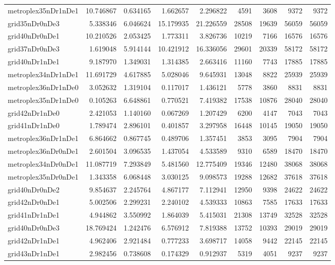 \begin{longtable}{|l|r|r|r|r|r|r|r|r|}
metroplex35nDr1nDe1 & 10.746867 & 0.634165 & 1.662657 & 2.296822 & 4591 & 3608 & 9372 & 9372 \\
grid35nDr0nDe3 & 5.338346 & 6.046624 & 15.179935 & 21.226559 & 28508 & 19639 & 56059 & 56059 \\
grid40nDr0nDe1 & 10.210526 & 2.053425 & 1.773311 & 3.826736 & 10219 & 7166 & 16576 & 16576 \\
grid37nDr0nDe3 & 1.619048 & 5.914144 & 10.421912 & 16.336056 & 29601 & 20339 & 58172 & 58172 \\
grid40nDr1nDe1 & 9.187970 & 1.349031 & 1.314385 & 2.663416 & 11160 & 7743 & 17885 & 17885 \\
metroplex34nDr1nDe1 & 11.691729 & 4.617885 & 5.028046 & 9.645931 & 13048 & 8822 & 25939 & 25939 \\
metroplex36nDr1nDe0 & 3.052632 & 1.319104 & 0.117017 & 1.436121 & 5778 & 3860 & 8831 & 8831 \\
metroplex35nDr1nDe0 & 0.105263 & 6.648861 & 0.770521 & 7.419382 & 17538 & 10876 & 28040 & 28040 \\
grid42nDr1nDe0 & 2.421053 & 1.140160 & 0.067269 & 1.207429 & 6200 & 4147 & 7043 & 7043 \\
grid41nDr1nDe0 & 1.789474 & 2.896101 & 0.401857 & 3.297958 & 16448 & 10145 & 19050 & 19050 \\
metroplex36nDr1nDe1 & 6.864662 & 0.867745 & 0.489706 & 1.357451 & 3853 & 3095 & 7904 & 7904 \\
metroplex36nDr0nDe1 & 2.601504 & 3.096535 & 1.437054 & 4.533589 & 9310 & 6589 & 18470 & 18470 \\
metroplex34nDr0nDe1 & 11.087719 & 7.293849 & 5.481560 & 12.775409 & 19346 & 12480 & 38068 & 38068 \\
metroplex35nDr0nDe1 & 1.343358 & 6.068448 & 3.030125 & 9.098573 & 19288 & 12682 & 37618 & 37618 \\
grid40nDr0nDe2 & 9.854637 & 2.245764 & 4.867177 & 7.112941 & 12950 & 9398 & 24622 & 24622 \\
grid42nDr0nDe1 & 5.002506 & 2.299231 & 2.240102 & 4.539333 & 10863 & 7585 & 17633 & 17633 \\
grid41nDr1nDe1 & 4.944862 & 3.550992 & 1.864039 & 5.415031 & 21308 & 13749 & 32528 & 32528 \\
grid40nDr0nDe3 & 18.769424 & 1.242476 & 6.576912 & 7.819388 & 13752 & 10393 & 29019 & 29019 \\
grid42nDr1nDe1 & 4.962406 & 2.921484 & 0.777233 & 3.698717 & 14058 & 9442 & 22145 & 22145 \\
grid43nDr1nDe1 & 2.982456 & 0.738608 & 0.174329 & 0.912937 & 5319 & 4051 & 9237 & 9237 \\

\end{longtable}
